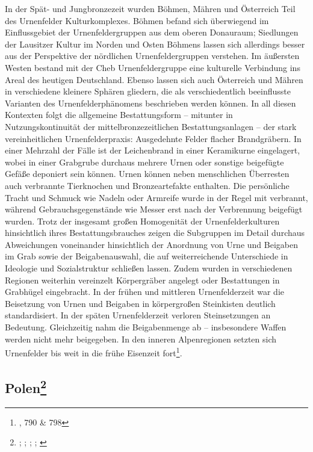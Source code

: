 \documentclass[openany,twoside,twocolumn]{book}
\let\rmarkdownfootnote\footnote%
\def\footnote{\protect\rmarkdownfootnote}
\begin{document}
In der Spät- und Jungbronzezeit wurden Böhmen, Mähren und Österreich
Teil des Urnenfelder Kulturkomplexes. Böhmen befand sich überwiegend im
Einflussgebiet der Urnenfeldergruppen aus dem oberen Donauraum;
Siedlungen der Lausitzer Kultur im Norden und Osten Böhmens lassen sich
allerdings besser aus der Perspektive der nördlichen Urnenfeldergruppen
verstehen. Im äußersten Westen bestand mit der Cheb Urnenfeldergruppe
eine kulturelle Verbindung ins Areal des heutigen Deutschland. Ebenso
lassen sich auch Österreich und Mähren in verschiedene kleinere Sphären
gliedern, die als verschiedentlich beeinflusste Varianten des
Urnenfelderphänomens beschrieben werden können. In all diesen Kontexten
folgt die allgemeine Bestattungsform -- mitunter in Nutzungskontinuität
der mittelbronzezeitlichen Bestattungsanlagen -- der stark
vereinheitlichen Urnenfelderpraxis: Ausgedehnte Felder flacher
Brandgräbern. In einer Mehrzahl der Fälle ist der Leichenbrand in einer
Keramikurne eingelagert, wobei in einer Grabgrube durchaus mehrere Urnen
oder sonstige beigefügte Gefäße deponiert sein können. Urnen können
neben menschlichen Überresten auch verbrannte Tierknochen und
Bronzeartefakte enthalten. Die persönliche Tracht und Schmuck wie Nadeln
oder Armreife wurde in der Regel mit verbrannt, während
Gebrauchsgegenstände wie Messer erst nach der Verbrennung beigefügt
wurden. Trotz der insgesamt großen Homogenität der Urnenfelderkulturen
hinsichtlich ihres Bestattungsbrauches zeigen die Subgruppen im Detail
durchaus Abweichungen voneinander hinsichtlich der Anordnung von Urne
und Beigaben im Grab sowie der Beigabenauswahl, die auf weiterreichende
Unterschiede in Ideologie und Sozialstruktur schließen lassen. Zudem
wurden in verschiedenen Regionen weiterhin vereinzelt Körpergräber
angelegt oder Bestattungen in Grabhügel eingebracht. In der frühen und
mittleren Urnenfelderzeit war die Beisetzung von Urnen und Beigaben in
körpergroßen Steinkisten deutlich standardisiert. In der späten
Urnenfelderzeit verloren Steinsetzungen an Bedeutung. Gleichzeitig nahm
die Beigabenmenge ab -- insbesondere Waffen werden nicht mehr
beigegeben. In den inneren Alpenregionen setzten sich Urnenfelder bis
weit in die frühe Eisenzeit fort\footnote{\textcite{lubos_czech_2013},
  790 \& 798}.

\hypertarget{polen}{%
\subsection[Polen]{\texorpdfstring{Polen\footnote{\textcite{dabrowski_aeltere_2004};
  \textcite{czebreszuk_bronze_2013};
  \textcite{czebreszuk_northeast_2003};
  \textcite{machnik_fruhbronzezeit_1977};
  \textcite{muller_bruszczewo_2004}}}{Polen}}\label{polen}}
\end{document}
